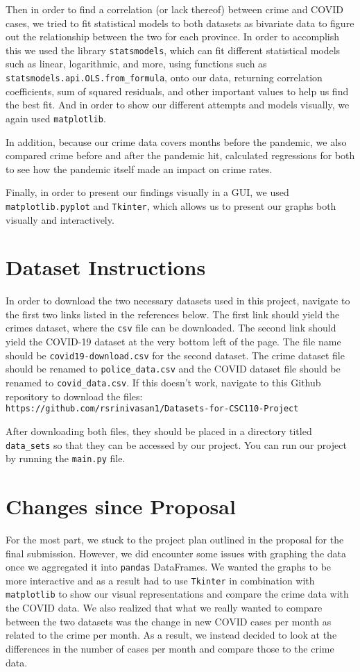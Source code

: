 \documentclass[fontsize=11pt]{article}
\begin{document}
Then in order to find a correlation (or lack thereof) between crime and COVID cases, we tried to fit statistical models to both datasets as bivariate data to figure out the relationship between the two for each province. In order to accomplish this we used the library \verb+statsmodels+, which can fit different statistical models such as linear, logarithmic, and more, using functions such as \verb+statsmodels.api.OLS.from_formula+, onto our data, returning correlation coefficients, sum of squared residuals, and other important values to help us find the best fit. And in order to show our different attempts and models visually, we again used \verb+matplotlib+.

In addition, because our crime data covers months before the pandemic, we also compared crime before and after the pandemic hit, calculated regressions for both to see how the pandemic itself made an impact on crime rates.

Finally, in order to present our findings visually in a GUI, we used \verb+matplotlib.pyplot+ and \verb+Tkinter+, which allows us to present our graphs both visually and interactively.

\section{Dataset Instructions}

In order to download the two necessary datasets used in this project, navigate to the first two links listed in the references below. The first link should yield the crimes dataset, where the \verb+csv+ file can be downloaded. The second link should yield the COVID-19 dataset at the very bottom left of the page. The file name should be \verb+covid19-download.csv+ for the second dataset. The crime dataset file should be renamed to \verb+police_data.csv+ and the COVID dataset file should be renamed to \verb+covid_data.csv+. If this doesn’t work, navigate to this Github repository to download the files:\\ \verb+https://github.com/rsrinivasan1/Datasets-for-CSC110-Project+

After downloading both files, they should be placed in a directory titled \verb+data_sets+ so that they can be accessed by our project. You can run our project by running the \verb+main.py+ file.

\section{Changes since Proposal}
For the most part, we stuck to the project plan outlined in the proposal for the final submission. However, we did encounter some issues with graphing the data once we aggregated it into \verb+pandas+ DataFrames. We wanted the graphs to be more interactive and as a result had to use \verb+Tkinter+ in combination with \verb+matplotlib+ to show our visual representations and compare the crime data with the COVID data. We also realized that what we really wanted to compare between the two datasets was the change in new COVID cases per month as related to the crime per month. As a result, we instead decided to look at the differences in the number of cases per month and compare those to the crime data.
\end{document}
